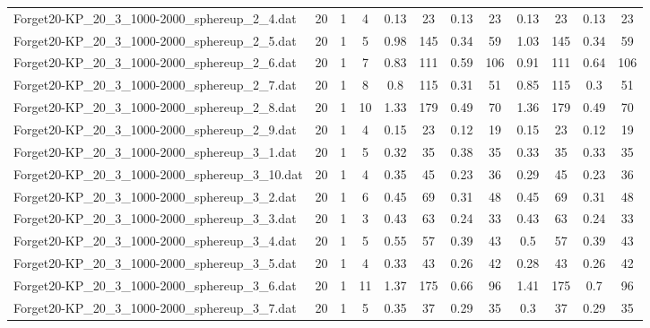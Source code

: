 \begin{sidewaystable}[!ht]
{\begin{tabular}{lccccccccccc}
Forget20-KP\_20\_3\_1000-2000\_sphereup\_2\_4.dat & 20 & 1 & 4 &  \textcolor{blue2}{0.13} & 23 &  \textcolor{blue2}{0.13} & 23 &  \textcolor{blue2}{0.13} & 23 &  \textcolor{blue2}{0.13} & 23 \\
Forget20-KP\_20\_3\_1000-2000\_sphereup\_2\_5.dat & 20 & 1 & 5 & 0.98 & 145 &  \textcolor{blue2}{0.34} & 59 & 1.03 & 145 &  \textcolor{blue2}{0.34} & 59 \\
Forget20-KP\_20\_3\_1000-2000\_sphereup\_2\_6.dat & 20 & 1 & 7 & 0.83 & 111 &  \textcolor{blue2}{0.59} & 106 & 0.91 & 111 & 0.64 & 106 \\
Forget20-KP\_20\_3\_1000-2000\_sphereup\_2\_7.dat & 20 & 1 & 8 & 0.8 & 115 & 0.31 & 51 & 0.85 & 115 &  \textcolor{blue2}{0.3} & 51 \\
Forget20-KP\_20\_3\_1000-2000\_sphereup\_2\_8.dat & 20 & 1 & 10 & 1.33 & 179 &  \textcolor{blue2}{0.49} & 70 & 1.36 & 179 &  \textcolor{blue2}{0.49} & 70 \\
Forget20-KP\_20\_3\_1000-2000\_sphereup\_2\_9.dat & 20 & 1 & 4 & 0.15 & 23 &  \textcolor{blue2}{0.12} & 19 & 0.15 & 23 &  \textcolor{blue2}{0.12} & 19 \\
Forget20-KP\_20\_3\_1000-2000\_sphereup\_3\_1.dat & 20 & 1 & 5 &  \textcolor{blue2}{0.32} & 35 & 0.38 & 35 & 0.33 & 35 & 0.33 & 35 \\
Forget20-KP\_20\_3\_1000-2000\_sphereup\_3\_10.dat & 20 & 1 & 4 & 0.35 & 45 &  \textcolor{blue2}{0.23} & 36 & 0.29 & 45 &  \textcolor{blue2}{0.23} & 36 \\
Forget20-KP\_20\_3\_1000-2000\_sphereup\_3\_2.dat & 20 & 1 & 6 & 0.45 & 69 &  \textcolor{blue2}{0.31} & 48 & 0.45 & 69 &  \textcolor{blue2}{0.31} & 48 \\
Forget20-KP\_20\_3\_1000-2000\_sphereup\_3\_3.dat & 20 & 1 & 3 & 0.43 & 63 &  \textcolor{blue2}{0.24} & 33 & 0.43 & 63 &  \textcolor{blue2}{0.24} & 33 \\
Forget20-KP\_20\_3\_1000-2000\_sphereup\_3\_4.dat & 20 & 1 & 5 & 0.55 & 57 &  \textcolor{blue2}{0.39} & 43 & 0.5 & 57 &  \textcolor{blue2}{0.39} & 43 \\
Forget20-KP\_20\_3\_1000-2000\_sphereup\_3\_5.dat & 20 & 1 & 4 & 0.33 & 43 &  \textcolor{blue2}{0.26} & 42 & 0.28 & 43 &  \textcolor{blue2}{0.26} & 42 \\
Forget20-KP\_20\_3\_1000-2000\_sphereup\_3\_6.dat & 20 & 1 & 11 & 1.37 & 175 & 0.66 & 96 & 1.41 & 175 & 0.7 & 96 \\
Forget20-KP\_20\_3\_1000-2000\_sphereup\_3\_7.dat & 20 & 1 & 5 & 0.35 & 37 &  \textcolor{blue2}{0.29} & 35 & 0.3 & 37 &  \textcolor{blue2}{0.29} & 35 \\

\end{tabular}}
\end{sidewaystable}
